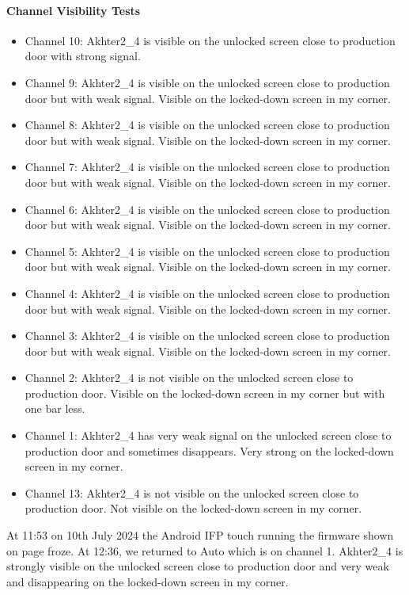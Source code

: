   \paragraph{Channel Visibility Tests}
  \begin{itemize}
    \item Channel 10: Akhter2\_4 is visible on the unlocked screen close to production door with strong signal.
    \item Channel 9: Akhter2\_4 is visible on the unlocked screen close to production door but with weak signal. Visible on the locked-down screen in my corner.
    \item Channel 8: Akhter2\_4 is visible on the unlocked screen close to production door but with weak signal. Visible on the locked-down screen in my corner.
    \item Channel 7: Akhter2\_4 is visible on the unlocked screen close to production door but with weak signal. Visible on the locked-down screen in my corner.
    \item Channel 6: Akhter2\_4 is visible on the unlocked screen close to production door but with weak signal. Visible on the locked-down screen in my corner.
    \item Channel 5: Akhter2\_4 is visible on the unlocked screen close to production door but with weak signal. Visible on the locked-down screen in my corner.
    \item Channel 4: Akhter2\_4 is visible on the unlocked screen close to production door but with weak signal. Visible on the locked-down screen in my corner.
    \item Channel 3: Akhter2\_4 is visible on the unlocked screen close to production door but with weak signal. Visible on the locked-down screen in my corner.
    \item Channel 2: Akhter2\_4 is not visible on the unlocked screen close to production door. Visible on the locked-down screen in my corner but with one bar less.
    \item Channel 1: Akhter2\_4 has very weak signal on the unlocked screen close to production door and sometimes disappears. Very strong on the locked-down screen in my corner.
    \item Channel 13: Akhter2\_4 is not visible on the unlocked screen close to production door. Not visible on the locked-down screen in my corner.
  \end{itemize}

  At 11:53 on 10th July 2024 the Android IFP touch running the firmware shown on page \pageref{sec:firmware20240611225217} froze.
  At 12:36, we returned to Auto which is on channel 1. Akhter2\_4 is strongly visible on the unlocked screen close to production door and very weak and disappearing on the locked-down screen in my corner.

